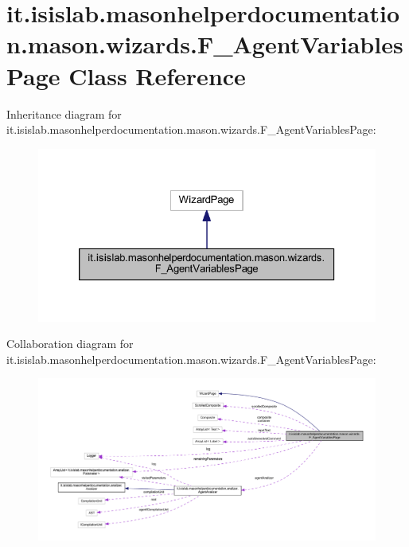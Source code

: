 \hypertarget{classit_1_1isislab_1_1masonhelperdocumentation_1_1mason_1_1wizards_1_1_f___agent_variables_page}{\section{it.\-isislab.\-masonhelperdocumentation.\-mason.\-wizards.\-F\-\_\-\-Agent\-Variables\-Page Class Reference}
\label{classit_1_1isislab_1_1masonhelperdocumentation_1_1mason_1_1wizards_1_1_f___agent_variables_page}
}


Inheritance diagram for it.\-isislab.\-masonhelperdocumentation.\-mason.\-wizards.\-F\-\_\-\-Agent\-Variables\-Page\-:\nopagebreak
\begin{figure}[H]
\begin{center}
\leavevmode
\includegraphics[width=326pt]{classit_1_1isislab_1_1masonhelperdocumentation_1_1mason_1_1wizards_1_1_f___agent_variables_page__inherit__graph}
\end{center}
\end{figure}


Collaboration diagram for it.\-isislab.\-masonhelperdocumentation.\-mason.\-wizards.\-F\-\_\-\-Agent\-Variables\-Page\-:\nopagebreak
\begin{figure}[H]
\begin{center}
\leavevmode
\includegraphics[width=350pt]{classit_1_1isislab_1_1masonhelperdocumentation_1_1mason_1_1wizards_1_1_f___agent_variables_page__coll__graph}
\end{center}
\end{figure}
